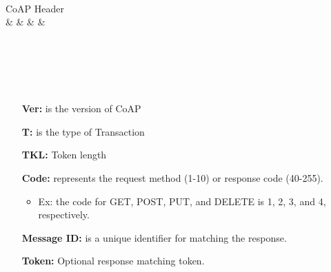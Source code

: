 \begin{bytefield}[bitwidth=1em]{32}
	                                                     \\
	\begin{rightwordgroup}{CoAP Header}                                  \\
	 &  &  &  & \\
	                                                        \\
	                                                      \\
	                                       \\
	\end{rightwordgroup}                                                 \\
\end{bytefield}


\begin{itemize}
	\item[\textbf{Ver:}] is the version of CoAP
	\item[\textbf{T:}] is the type of Transaction
	\item[\textbf{TKL:}] Token length
	\item[\textbf{Code:}] represents the request method (1-10) or response code (40-255).
		\begin{itemize}
			\item Ex: the code for GET, POST, PUT, and DELETE is 1, 2, 3, and 4, respectively.
		\end{itemize}
	\item[\textbf{Message ID:}] is a unique identifier for matching the response.
	\item[\textbf{Token:}] Optional response matching token.
\end{itemize}
	
